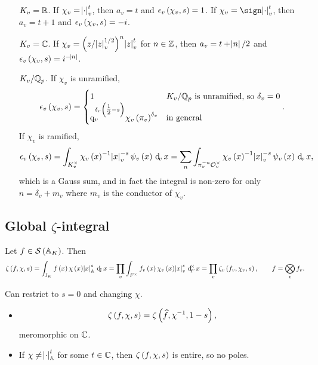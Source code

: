 \begin{itemize}[leftmargin=0.5in]
\item[$ K_v = \mathbb{R} $.] If $ \chi_v = \abs{\cdot}_v^t $, then $ a_v = t $ and $ \epsilon_v\br{\chi_v, s} = 1 $. If $ \chi_v = \sign\abs{\cdot}_v^t $, then $ a_v = t + 1 $ and $ \epsilon_v\br{\chi_v, s} = -i $.
\item[$ K_v = \mathbb{C} $.] If $ \chi_v = \br{z / \abs{z}_v^{1 / 2}}^n\abs{z}_v^t $ for $ n \in \mathbb{Z} $, then $ a_v = t + \abs{n} / 2 $ and $ \epsilon_v\br{\chi_v, s} = i^{-\abs{n}} $.

\pagebreak

\item[$ K_v / \mathbb{Q}_p $.] If $ \chi_v $ is unramified,
$$ \epsilon_v\br{\chi_v, s} =
\begin{cases}
1 & K_v / \QQ_p \ \text{is unramified, so} \ \delta_v = 0 \\
\q_v^{\delta_v\br{\tfrac{1}{2} - s}}\chi_v\br{\pi_v}^{\delta_v} & \text{in general}
\end{cases}.
$$
If $ \chi_v $ is ramified,
$$ \epsilon_v\br{\chi_v, s} = \intv[K_v^\times]{\chi_v\br{x}^{-1}\abs{x}_v^{-s}\psi_v\br{x}}{x} = \sum_n \intv[\pi_v^{-n}\OOO_v^\times]{\chi_v\br{x}^{-1}\abs{x}_v^{-s}\psi_v\br{x}}{x}, $$
which is a Gauss sum, and in fact the integral is non-zero for only $ n = \delta_v + m_v $ where $ m_v $ is the conductor of $ \chi_v $.
\end{itemize}

\subsection{Global \texorpdfstring{$ \zeta $}{zeta}-integral}


\begin{definition*}
Let $ f \in \SSS\br{\AA_K} $. Then
$$ \zeta\br{f, \chi, s} = \intJ{f\br{x}\chi\br{x}\abs{x}_\AA^s}{x} = \prod_v \intFX{f_v\br{x}\chi_v\br{x}\abs{x}_v^s}{x} = \prod_v \zeta_v\br{f_v, \chi_v, s}, \qquad f = \bigotimes_v f_v. $$
\end{definition*}

Can restrict to $ s = 0 $ and changing $ \chi $.

\begin{theorem}
\hfill
\begin{itemize}
\item
$$ \zeta\br{f, \chi, s} = \zeta\br{\widehat{f}, \chi^{-1}, 1 - s}, $$
meromorphic on $ \mathbb{C} $.
\item If $ \chi \ne \abs{\cdot}_{\mathbb{A}}^t $ for some $ t \in \mathbb{C} $, then $ \zeta\br{f, \chi, s} $ is entire, so no poles.
\end{itemize}
\end{theorem}

